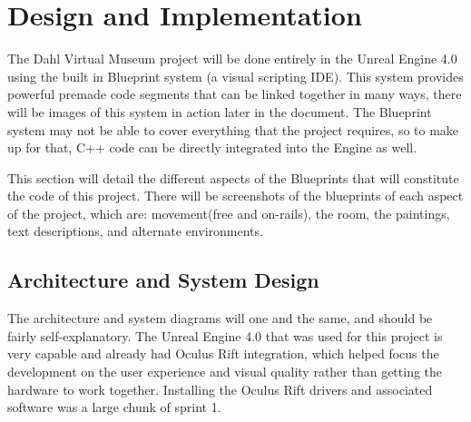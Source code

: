 

\chapter{Design  and Implementation}
The Dahl Virtual Museum project will be done entirely in the Unreal Engine 4.0 using the built in Blueprint system (a visual scripting IDE).  This system provides powerful premade code segments that can be linked together in many ways, there will be images of this system in action later in the document.  The Blueprint system may not be able to cover everything that the project requires, so to make up for that, C++ code can be directly integrated into the Engine as well.  

This section will detail the different aspects of the Blueprints that will constitute the code of this project.  There will be screenshots of the blueprints of each aspect of the project, which are: movement(free and on-rails), the room, the paintings, text descriptions, and alternate environments. 
 


 
 \section{Architecture and System Design}
 The architecture and system diagrams will one and the same, and should be fairly self-explanatory.  
 The Unreal Engine 4.0 that was used for this project is very capable and already had Oculus Rift integration, which helped focus the development on the user experience and visual quality rather than getting the hardware to work together.  Installing the Oculus Rift drivers and associated software was a large chunk of sprint 1.   
 
